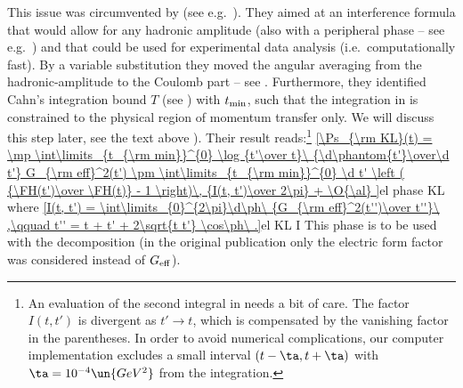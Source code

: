 
This issue was circumvented by \KaL{} (see e.g.~). They aimed at an interference formula that would allow for any hadronic amplitude (also with a peripheral phase -- see e.g.~) and that could be used for experimental data analysis (i.e.~computationally fast). By a variable substitution they moved the angular averaging from the hadronic-amplitude to the Coulomb part -- see . Furthermore, they identified Cahn's integration bound $T$ (see ) with $t_{\rm min}$, such that the integration in  is constrained to the physical region of momentum transfer only. We will discuss this step later, see the text above ). Their result reads:\footnote{%
An evaluation of the second integral in  needs a bit of care. The factor $I(t, t')$ is divergent as $t'\to t$, which is compensated by the vanishing factor in the parentheses. In order to avoid numerical complications, our computer implementation excludes a small interval $(t-\ta, t+\ta)$ with $\ta = 10^{-4}\un{GeV^2}$ from the integration.
}
\eqref{\Ps_{\rm KL}(t) =
	\mp \int\limits_{t_{\rm min}}^{0} \log {t'\over t}\ {\d\phantom{t'}\over\d t'} G_{\rm eff}^2(t')
	\pm \int\limits_{t_{\rm min}}^{0} \d t' \left ( {\FH(t')\over \FH(t)} - 1 \right)\, {I(t, t')\over 2\pi}
	+ \O{\al}
}{el phase KL}
where
\eqref{I(t, t') = \int\limits_{0}^{2\pi}\d\ph\ {G_{\rm eff}^2(t'')\over t''}\ ,\qquad t'' = t + t' + 2\sqrt{t t'} \cos\ph\ .}{el KL I}
This phase is to be used with the decomposition  (in the original publication  only the electric form factor was considered instead of $G_{\rm eff}$).

